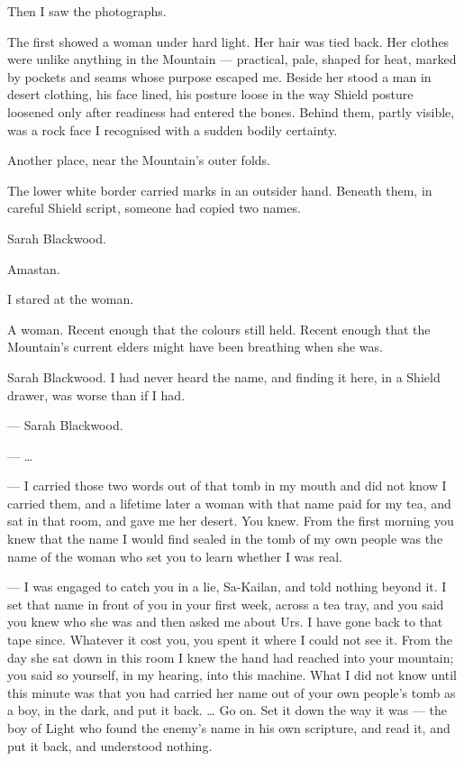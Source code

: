 \ornament

Then I saw the photographs.\par

The first showed a woman under hard light. Her hair was tied back. Her clothes were unlike anything in the Mountain --- practical, pale, shaped for heat, marked by pockets and seams whose purpose escaped me. Beside her stood a man in desert clothing, his face lined, his posture loose in the way Shield posture loosened only after readiness had entered the bones. Behind them, partly visible, was a rock face I recognised with a sudden bodily certainty.\par

Another place, near the Mountain's outer folds.\par

The lower white border carried marks in an outsider hand. Beneath them, in careful Shield script, someone had copied two names.\par

Sarah Blackwood.\par

Amastan.\par

I stared at the woman.\par

A woman. Recent enough that the colours still held. Recent enough that the Mountain's current elders might have been breathing when she was.\par

Sarah Blackwood. I had never heard the name, and finding it here, in a Shield drawer, was worse than if I had.\par

\ornament

\begin{room}

--- Sarah Blackwood.

--- \ldots{}

--- I carried those two words out of that tomb in my mouth and did not know I carried them, and a lifetime later a woman with that name paid for my tea, and sat in that room, and gave me her desert. You knew. From the first morning you knew that the name I would find sealed in the tomb of my own people was the name of the woman who set you to learn whether I was real.

--- I was engaged to catch you in a lie, Sa-Kailan, and told nothing beyond it. I set that name in front of you in your first week, across a tea tray, and you said you knew who she was and then asked me about Urs. I have gone back to that tape since. Whatever it cost you, you spent it where I could not see it. From the day she sat down in this room I knew the hand had reached into your mountain; you said so yourself, in my hearing, into this machine. What I did not know until this minute was that you had carried her name out of your own people's tomb as a boy, in the dark, and put it back. \ldots{} Go on. Set it down the way it was --- the boy of Light who found the enemy's name in his own scripture, and read it, and put it back, and understood nothing.

\end{room}

